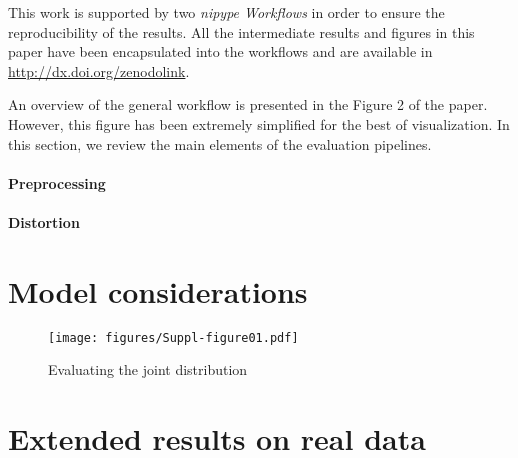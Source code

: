 \documentclass[a4paper]{report}
\begin{document}
This work is supported by two \emph{nipype Workflows} in order to ensure the reproducibility
  of the results.
All the intermediate results and figures in this paper have been encapsulated into
  the workflows and are available in \url{http://dx.doi.org/zenodolink}.

An overview of the general workflow is presented in the Figure 2 of the paper.
However, this figure has been extremely simplified for the best of visualization.
In this section, we review the main elements of the evaluation pipelines.

\paragraph{Preprocessing}

\paragraph{Distortion}

\section{Model considerations}

\begin{figure*}[!ht]
	\texttt{[image: figures/Suppl-figure01.pdf]}
	\caption{Evaluating the joint distribution}\label{fig:jointplot}
\end{figure*}

\newpage
\section{Extended results on real data}

\immediate{}

\end{document}
